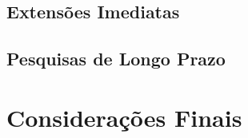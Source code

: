 \subsection{Extensões Imediatas}


\subsection{Pesquisas de Longo Prazo}


\section{Considerações Finais}

